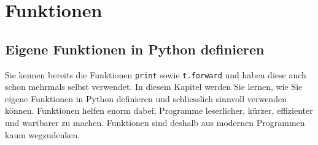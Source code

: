 \chapter{Funktionen}\label{ch:K05_Functions}

\section{Eigene Funktionen in Python definieren}

Sie kennen bereits die Funktionen \lstinline|print| sowie \lstinline|t.forward| und haben diese auch schon mehrmals selbst verwendet. In diesem Kapitel werden Sie lernen, wie Sie eigene Funktionen in Python definieren und schliesslich sinnvoll verwenden können. Funktionen helfen enorm dabei, Programme leserlicher, kürzer, effizienter und wartbarer zu machen. Funktionen sind deshalb aus modernen Programmen kaum wegzudenken.

